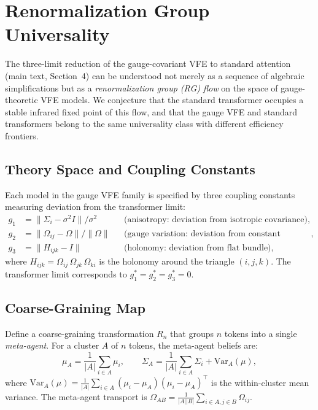 \documentclass[twoside,11pt]{article}
\begin{document}
\section{Renormalization Group Universality}
\label{app:rg_universality}

The three-limit reduction of the gauge-covariant VFE to standard attention (main text, Section~4) can be understood not merely as a sequence of algebraic simplifications but as a \emph{renormalization group (RG) flow} on the space of gauge-theoretic VFE models. We conjecture that the standard transformer occupies a stable infrared fixed point of this flow, and that the gauge VFE and standard transformers belong to the same universality class with different efficiency frontiers.

\subsection{Theory Space and Coupling Constants}

Each model in the gauge VFE family is specified by three coupling constants measuring deviation from the transformer limit:
\begin{align}
g_1 &= \|\Sigma_i - \sigma^2 I\| / \sigma^2 & &\text{(anisotropy: deviation from isotropic covariance)}, \label{eq:g1_def_supp} \\
g_2 &= \|\Omega_{ij} - \Omega\| / \|\Omega\| & &\text{(gauge variation: deviation from constant transport)}, \label{eq:g2_def_supp} \\
g_3 &= \|H_{ijk} - I\| & &\text{(holonomy: deviation from flat bundle)}, \label{eq:g3_def_supp}
\end{align}
where $H_{ijk} = \Omega_{ij}\,\Omega_{jk}\,\Omega_{ki}$ is the holonomy around the triangle $(i,j,k)$.  The transformer limit corresponds to $g_1^* = g_2^* = g_3^* = 0$.

\subsection{Coarse-Graining Map}

Define a coarse-graining transformation $R_n$ that groups $n$ tokens into a single \emph{meta-agent}. For a cluster $A$ of $n$ tokens, the meta-agent beliefs are:
\begin{equation}
\mu_A = \frac{1}{|A|} \sum_{i \in A} \mu_i, \qquad
\Sigma_A = \frac{1}{|A|} \sum_{i \in A} \Sigma_i + \mathrm{Var}_A(\mu),
\label{eq:meta_agent_beliefs_supp}
\end{equation}
where $\mathrm{Var}_A(\mu) = \frac{1}{|A|} \sum_{i \in A} (\mu_i - \mu_A)(\mu_i - \mu_A)^\top$ is the within-cluster mean variance. The meta-agent transport is $\Omega_{AB} = \frac{1}{|A||B|} \sum_{i \in A, j \in B} \Omega_{ij}$.
\end{document}
